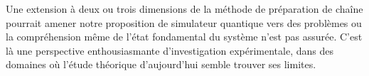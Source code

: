 Une extension à deux ou trois dimensions de la méthode de préparation de chaîne pourrait amener notre proposition de simulateur quantique vers des problèmes ou la compréhension même de l'état fondamental du système n'est pas assurée.
C'est là une perspective enthousiasmante d'investigation expérimentale, dans des domaines où l'étude théorique d'aujourd'hui semble trouver ses limites.


%
%
%
%
%
%
%
%
